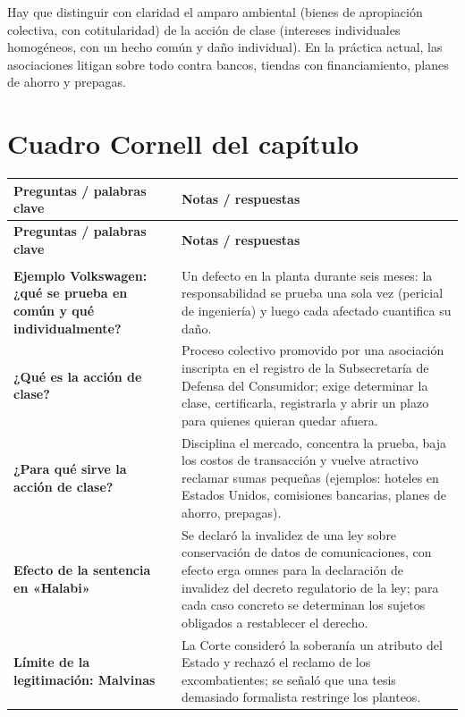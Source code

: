 \documentclass[12pt,oneside]{book}
\newcommand{\cornellrow}[2]{\textbf{#1} & #2 \\[0.6em]}
\begin{document}
\begin{important}
Hay que distinguir con claridad el amparo ambiental (bienes de apropiación colectiva, con cotitularidad) de la acción de clase (intereses individuales homogéneos, con un hecho común y daño individual). En la práctica actual, las asociaciones litigan sobre todo contra bancos, tiendas con financiamiento, planes de ahorro y prepagas.
\end{important}

\section{Cuadro Cornell del capítulo}

\begin{longtable}{
    >{\raggedright\arraybackslash}p{}
    >{\raggedright\arraybackslash}p{}
}
\toprule
\textbf{Preguntas / palabras clave} & \textbf{Notas / respuestas} \\
\midrule
\endfirsthead
\toprule
\textbf{Preguntas / palabras clave} & \textbf{Notas / respuestas} \\
\midrule
\endhead
\midrule
\multicolumn{2}{r}{\small\textit{Continúa en la página siguiente}} \\
\endfoot
\bottomrule
\endlastfoot

\cornellrow{Ejemplo Volkswagen: ¿qué se prueba en común y qué individualmente?}{Un defecto en la planta durante seis meses: la responsabilidad se prueba una sola vez (pericial de ingeniería) y luego cada afectado cuantifica su daño.}

\cornellrow{¿Qué es la acción de clase?}{Proceso colectivo promovido por una asociación inscripta en el registro de la Subsecretaría de Defensa del Consumidor; exige determinar la clase, certificarla, registrarla y abrir un plazo para quienes quieran quedar afuera.}

\cornellrow{¿Para qué sirve la acción de clase?}{Disciplina el mercado, concentra la prueba, baja los costos de transacción y vuelve atractivo reclamar sumas pequeñas (ejemplos: hoteles en Estados Unidos, comisiones bancarias, planes de ahorro, prepagas).}

\cornellrow{Efecto de la sentencia en «Halabi»}{Se declaró la invalidez de una ley sobre conservación de datos de comunicaciones, con efecto erga omnes para la declaración de invalidez del decreto regulatorio de la ley; para cada caso concreto se determinan los sujetos obligados a restablecer el derecho.}

\cornellrow{Límite de la legitimación: Malvinas}{La Corte consideró la soberanía un atributo del Estado y rechazó el reclamo de los excombatientes; se señaló que una tesis demasiado formalista restringe los planteos.}


\end{longtable}
\end{document}
